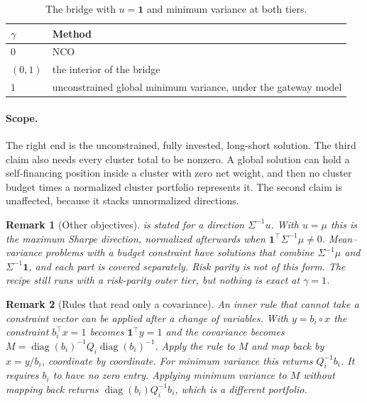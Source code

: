 \documentclass[11pt]{article}
\newcommand{\ones}{\mathbf{1}}
\DeclareMathOperator{\diag}{diag}
\newtheorem{remark}{Remark}
\begin{document}
\begin{table}[ht]
\centering
\begin{tabular}{@{}ll@{}}
\toprule
$\gamma$ & Method \\
\midrule
$0$ & NCO \parencite{lopezdeprado2020} \\
$(0,1)$ & the interior of the bridge \\
$1$ & unconstrained global minimum variance, under the gateway model \\
\bottomrule
\end{tabular}
\caption{The bridge with $u=\ones$ and minimum variance at both tiers.}
\label{tab:bridge}
\end{table}

\paragraph{Scope.} The right end is the unconstrained, fully invested,
long-short solution. The third claim also needs every cluster total to be
nonzero. A global solution can hold a self-financing position inside a
cluster with zero net weight, and then no cluster budget times a normalized
cluster portfolio represents it. The second claim is unaffected, because it
stacks unnormalized directions.

\begin{remark}[Other objectives]
 is stated for a direction $\Sigma^{-1}u$. With $u=\mu$
this is the maximum Sharpe direction, normalized afterwards when
$\ones^\top\Sigma^{-1}\mu\neq0$. Mean--variance problems with a budget
constraint have solutions that combine $\Sigma^{-1}\mu$ and
$\Sigma^{-1}\ones$, and each part is covered separately. Risk parity is not
of this form. The recipe still runs with a risk-parity outer tier, but
nothing is exact at $\gamma=1$.
\end{remark}

\begin{remark}[Rules that read only a covariance]
An inner rule that cannot take a constraint vector can be applied after a
change of variables. With $y=b_i\circ x$ the constraint $b_i^\top x=1$
becomes $\ones^\top y=1$ and the covariance becomes
$M=\diag(b_i)^{-1}Q_i\diag(b_i)^{-1}$. Apply the rule to $M$ and map back by
$x=y/b_i$, coordinate by coordinate. For minimum variance this returns
$Q_i^{-1}b_i$. It requires $b_i$ to have no zero entry. Applying minimum
variance to $M$ without mapping back returns $\diag(b_i)Q_i^{-1}b_i$, which
is a different portfolio.
\end{remark}
\end{document}

